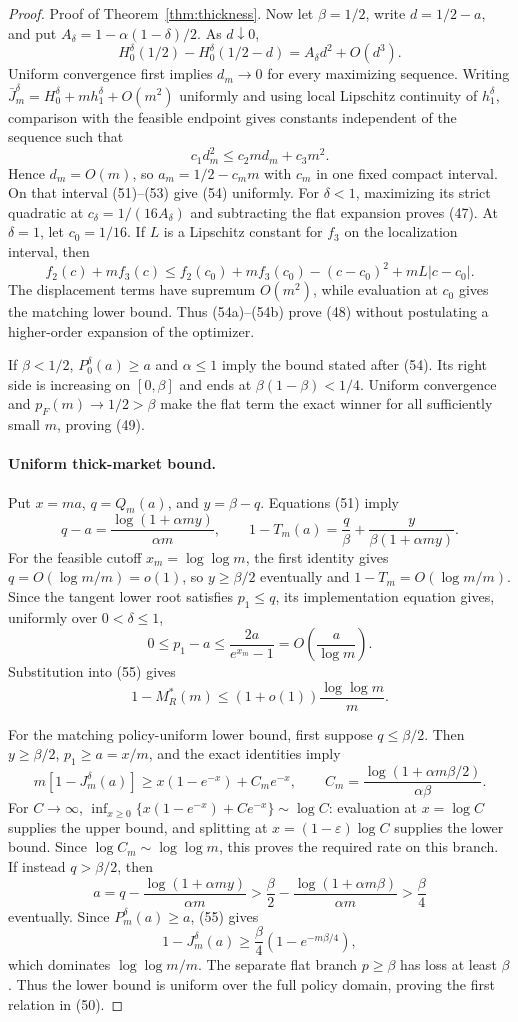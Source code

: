 \documentclass[mnsc,blindrev]{informs3}
\begin{document}
\begin{proof}{Proof of Theorem~\ref{thm:thickness}.}
Now let $\beta=1/2$, write $d=1/2-a$, and put
$A_\delta=1-\alpha(1-\delta)/2$.  As $d\downarrow0$,
\[
 H_0^\delta(1/2)-H_0^\delta(1/2-d)
 =A_\delta d^2+O(d^3).
\]
Uniform convergence first implies $d_m\to0$ for every maximizing sequence.
Writing $\bar J_m^\delta=H_0^\delta+mh_1^\delta+O(m^2)$ uniformly and using
local Lipschitz continuity of $h_1^\delta$, comparison with the feasible
endpoint gives constants independent of the sequence such that
\[
 c_1d_m^2\le c_2m d_m+c_3m^2.
\]
Hence $d_m=O(m)$, so $a_m=1/2-c_m m$ with $c_m$ in one fixed compact
interval.  On that interval (51)--(53) give (54) uniformly.  For
$\delta<1$, maximizing its strict quadratic at
$c_\delta=1/(16A_\delta)$ and subtracting the flat expansion proves (47).
At $\delta=1$, let $c_0=1/16$.  If $L$ is a Lipschitz constant for $f_3$ on
the localization interval, then
\[
 f_2(c)+mf_3(c)\le f_2(c_0)+mf_3(c_0)
 -(c-c_0)^2+mL|c-c_0|.
\]
The displacement terms have supremum $O(m^2)$, while evaluation at $c_0$
gives the matching lower bound.  Thus (54a)--(54b) prove (48) without
postulating a higher-order expansion of the optimizer.

If $\beta<1/2$, $P_0^\delta(a)\ge a$ and $\alpha\le1$ imply the bound stated
after (54).  Its right side is increasing on $[0,\beta]$ and ends at
$\beta(1-\beta)<1/4$.  Uniform convergence and $p_F(m)\to1/2>\beta$ make the
flat term the exact winner for all sufficiently small $m$, proving (49).

\paragraph{Uniform thick-market bound.}
Put $x=ma$, $q=Q_m(a)$, and $y=\beta-q$.  Equations (51) imply
\[
 q-a=\frac{\log(1+\alpha my)}{\alpha m},\qquad
 1-T_m(a)=\frac q\beta+\frac{y}{\beta(1+\alpha my)}.
\]
For the feasible cutoff $x_m=\log\log m$, the first identity gives
$q=O(\log m/m)=o(1)$, so $y\ge\beta/2$ eventually and
$1-T_m=O(\log m/m)$.  Since the tangent lower root satisfies $p_1\le q$, its
implementation equation gives, uniformly over $0<\delta\le1$,
\[
 0\le p_1-a\le\frac{2a}{e^{x_m}-1}
 =O\!\left(\frac{a}{\log m}\right).
\]
Substitution into (55) gives
\[
 1-M_R^*(m)\le(1+o(1))\frac{\log\log m}{m}.
\]

For the matching policy-uniform lower bound, first suppose $q\le\beta/2$.
Then $y\ge\beta/2$, $p_1\ge a=x/m$, and the exact identities imply
\[
 m[1-J_m^\delta(a)]\ge x(1-e^{-x})+C_m e^{-x},\qquad
 C_m=\frac{\log(1+\alpha m\beta/2)}{\alpha\beta}.
\]
For $C\to\infty$,
$\inf_{x\ge0}\{x(1-e^{-x})+Ce^{-x}\}\sim\log C$: evaluation at
$x=\log C$ supplies the upper bound, and splitting at
$x=(1-\varepsilon)\log C$ supplies the lower bound.  Since
$\log C_m\sim\log\log m$, this proves the required rate on this branch.
If instead $q>\beta/2$, then
\[
 a=q-\frac{\log(1+\alpha my)}{\alpha m}
 >\frac\beta2-\frac{\log(1+\alpha m\beta)}{\alpha m}
 >\frac\beta4
\]
eventually.  Since $P_m^\delta(a)\ge a$, (55) gives
\[
 1-J_m^\delta(a)\ge\frac\beta4(1-e^{-m\beta/4}),
\]
which dominates $\log\log m/m$.  The separate flat branch $p\ge\beta$ has
loss at least $\beta$.  Thus the lower bound is uniform over the full policy
domain, proving the first relation in (50).


\end{proof}
\end{document}
